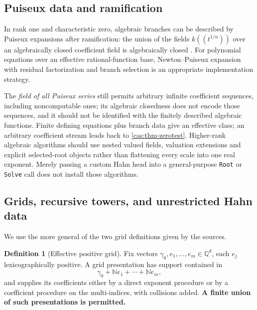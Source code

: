 \documentclass[11pt,letterpaper]{article}
\numberwithin{equation}{section}
\theoremstyle{definition}
\newtheorem{definition}[theorem]{Definition}
\theoremstyle{remark}
\newcommand{\Q}{\mathbb Q}
\newcommand{\N}{\mathbb N}
\begin{document}
\subsection{Puiseux data and ramification}
\label{cas:sub-puiseux}
In rank one and characteristic zero, algebraic branches can be described by
Puiseux expansions after ramification: the union of the fields $k((t^{1/n}))$
over an algebraically closed coefficient field is algebraically closed
\cite[Corollary 7]{cas:Poonen}. For polynomial equations over an effective
rational-function base, Newton--Puiseux expansion with residual factorization
and branch selection is an appropriate implementation strategy.

The \emph{field of all Puiseux series} still permits arbitrary infinite
coefficient sequences, including noncomputable ones; its algebraic closedness
does not encode those sequences, and it should not be identified with the
finitely described algebraic functions. Finite defining equations plus branch
data give an effective class; an arbitrary coefficient stream leads back to
\cref{cas:thm-zerotest}. Higher-rank algebraic algorithms should use nested
valued fields, valuation extensions and explicit selected-root objects rather
than flattening every scale into one real exponent. Merely passing a custom Hahn
head into a general-purpose \texttt{Root} or \texttt{Solve} call does not
install those algorithms.

\subsection{Grids, recursive towers, and unrestricted Hahn data}
\label{cas:sub-grids}
We use the more general of the two grid definitions given by the sources.

\begin{definition}[Effective positive grid]\label{cas:def-grid}
Fix vectors $\gamma_0,e_1,\ldots,e_m\in\Q^d$, each $e_j$ lexicographically
positive. A grid presentation has support contained in
\begin{equation}\label{cas:eq-grid}
 \gamma_0+\N e_1+\cdots+\N e_m ,
\end{equation}
and supplies its coefficients either by a direct exponent procedure or by a
coefficient procedure on the multi-indices, with collisions added. \textbf{A
finite union of such presentations is permitted.}
\end{definition}
\end{document}
